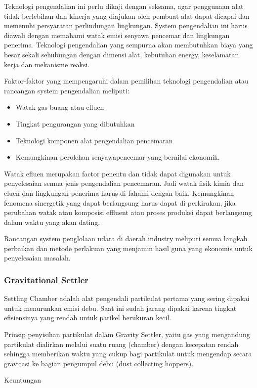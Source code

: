 \documentclass[../wastek.tex]{subfiles}
\begin{document}
Teknologi pengendalian ini perlu dikaji dengan seksama, agar penggunaan alat tidak berlebihan dan kinerja yang diajukan oleh pembuat alat dapat dicapai dan memenuhi persyaratan perlindungan lingkungan. System pengendalian ini harus diawali dengan memahami watak emisi senyawa pencemar dan lingkungan penerima. Teknologi pengendalian yang sempurna akan membutuhkan biaya yang besar sekali sehubungan dengan dimensi alat, kebutuhan energy, keselamatan kerja dan mekanisme reaksi.


Faktor-faktor yang mempengaruhi dalam pemilihan teknologi pengendalian atau rancangan system pengendalian meliputi:
\begin{itemize}
	\item Watak gas buang atau efluen
	\item Tingkat pengurangan yang dibutuhkan
	\item Teknologi komponen alat pengendalian pencemaran
	\item Kemungkinan perolehan senyawapencemar yang bernilai ekonomik.
\end{itemize}
Watak efluen merupakan factor penentu dan tidak dapat digunakan untuk penyelesaian semua jenis pengendalian pencemaran. Jadi watak fisik kimia dan eluen dan lingkungan penerima harus di fahami dengan baik. Kemungkinan fenomena sinergetik yang dapat berlangsung harus dapat di perkirakan, jika perubahan watak atau komposisi effluent atau proses produksi dapat berlangsung dalam waktu yang akan dating.


Rancangan system penglolaan udara di daerah industry meliputi semua langkah perbaikan dan metode perlakuan yang menjamin hasil guna yang ekonomis untuk penyelesaian masalah.

\subsubsection{Gravitational Settler}%
\label{ssub:gravitational_settler}
Settling Chamber adalah alat pengendali partikulat pertama yang sering dipakai untuk menurunkan emisi debu. Saat ini sudah jarang dipakai karena tingkat efisiensinya yang rendah untuk patikel berukuran kecil.

Prinsip penyisihan partikulat dalam Gravity Settler, yaitu gas yang mengandung partikulat dialirkan melalui suatu ruang (chamber) dengan kecepatan rendah sehingga memberikan waktu yang cukup bagi partikulat untuk mengendap secara gravitasi ke bagian pengumpul debu (dust collecting hoppers).

Keuntungan
\end{document}
